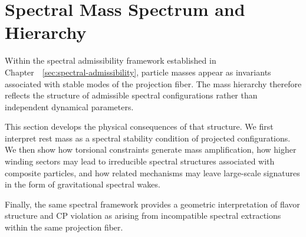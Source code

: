 \clearpage

\section{Spectral Mass Spectrum and Hierarchy}
  \label{sec:spectral-mass-hierarchy}

  Within the spectral admissibility framework established in
  Chapter~~\ref{sec:spectral-admissibility}, particle masses appear as invariants associated with
  stable modes of the projection fiber.
  The mass hierarchy therefore reflects the structure of admissible
  spectral configurations rather than independent dynamical
  parameters.

  This section develops the physical consequences of that structure.
  We first interpret rest mass as a spectral stability condition of
  projected configurations.
  We then show how torsional constraints generate mass amplification,
  how higher winding sectors may lead to irreducible spectral
  structures associated with composite particles, and how related
  mechanisms may leave large-scale signatures in the form of
  gravitational spectral wakes.

  Finally, the same spectral framework provides a geometric
  interpretation of flavor structure and CP violation as arising
  from incompatible spectral extractions within the same projection
  fiber.

  
  
  
  
  
  
